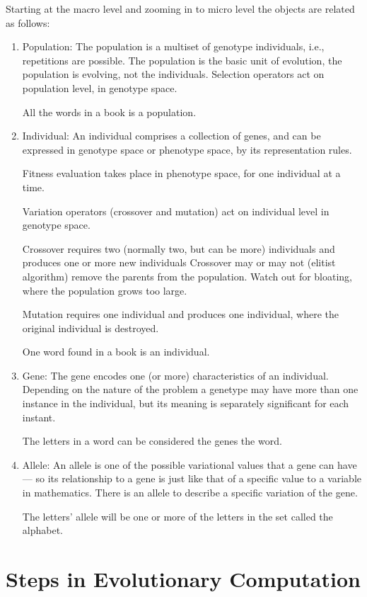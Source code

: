 Starting at the macro level and zooming in to micro level the objects are related as follows:

\begin{enumerate}
\item Population: The population is a multiset of genotype individuals, i.e., repetitions are possible.
The population is the basic unit of evolution, the population is evolving, not the individuals.
Selection operators act on population level, in genotype space.

All the words in a book is a population.

\item Individual:
An individual comprises a collection of genes, and can be expressed in genotype space or phenotype space, by its representation rules.

Fitness evaluation takes place in phenotype space, for one individual at a time.

Variation operators (crossover and mutation) act on individual level in genotype space.

Crossover requires two (normally two, but can be more) individuals and produces one or more new individuals Crossover may or may not (elitist algorithm) remove the parents from the population. Watch out for bloating, where the population grows too large.

Mutation requires one individual and produces one individual, where the original individual is destroyed.  

One word found in a book is an individual.

\item Gene:
The gene encodes one (or more) characteristics of an individual. Depending on the nature of the problem a genetype may have more than one instance in the individual, but its meaning is separately significant for each instant. 

The letters in a word can be considered the genes the word.


\item Allele:
An allele is one of the possible variational values that a gene can have --- so its relationship to a gene is just like that of a specific value to a variable in mathematics. 
There is an allele to describe a specific variation of the gene.

The letters' allele will be one or more of the letters in the set called the alphabet.
\end{enumerate}


\section{Steps in Evolutionary Computation}

